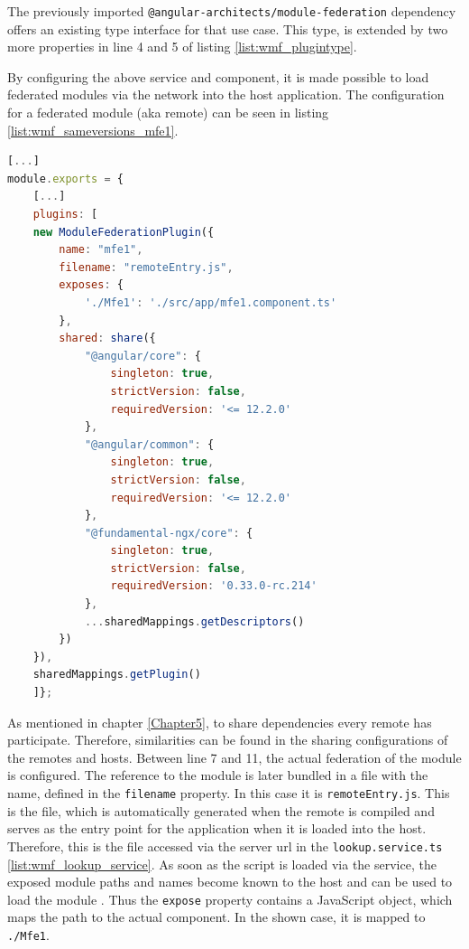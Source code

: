 The previously imported \texttt{@angular-architects/module-federation} dependency offers an existing type interface for that use case. This type, is extended by two more properties in line 4 and 5 of listing \ref{list:wmf_plugintype}.

By configuring the above service and component, it is made possible to load federated modules via the network into the host application.
The configuration for a federated module (aka remote) can be seen in listing \ref{list:wmf_sameversions_mfe1}.

\begin{lstlisting}[language=JavaScript, caption=Content of \texttt{webpack.config.js} of the mfe1 remote app of the same versions WMF project, label=list:wmf_sameversions_mfe1,  xleftmargin=.0\textwidth, xrightmargin=.0\textwidth]
[...]
module.exports = {
	[...]
	plugins: [
	new ModuleFederationPlugin({
		name: "mfe1",
		filename: "remoteEntry.js",
		exposes: {
			'./Mfe1': './src/app/mfe1.component.ts'
		},
		shared: share({
			"@angular/core": { 
				singleton: true, 
				strictVersion: false, 
				requiredVersion: '<= 12.2.0' 
			},
			"@angular/common": { 
				singleton: true, 
				strictVersion: false, 
				requiredVersion: '<= 12.2.0' 
			},
			"@fundamental-ngx/core": { 
				singleton: true, 
				strictVersion: false,
				requiredVersion: '0.33.0-rc.214' 
			},
			...sharedMappings.getDescriptors()
		})
	}),
	sharedMappings.getPlugin()
	]};
\end{lstlisting}

As mentioned in chapter \ref{Chapter5}, to share dependencies every remote has participate. Therefore, similarities can be found in the sharing configurations of the remotes and hosts. 
Between line 7 and 11, the actual federation of the module is configured. The reference to the module is later bundled in a file with the name, defined in the \texttt{filename} property. In this case it is \texttt{remoteEntry.js}.
This is the file, which is automatically generated when the remote is compiled and serves as the entry point for the application when it is loaded into the host. Therefore, this is the file accessed via the server url in the \texttt{lookup.service.ts} \ref{list:wmf_lookup_service}.
As soon as the script is loaded via the service, the exposed module paths and names become known to the host and can be used to load the module \cite{wmf_concepts}. Thus the \texttt{expose} property contains a JavaScript object, which maps the path to the actual component. In the shown case, it is mapped to \texttt{./Mfe1}.

